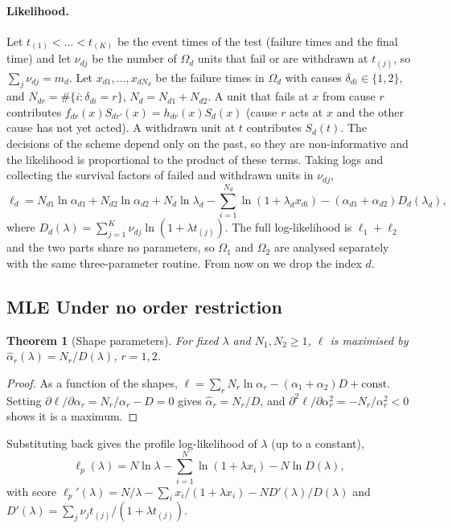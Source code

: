 \documentclass[a4paper,11pt]{article}
\newtheorem{theorem}{Theorem}[section]
\begin{document}
\paragraph{Likelihood.} Let $t_{(1)}<\dots<t_{(K)}$ be the event times of the test (failure times and the final time) and let $\nu_{dj}$ be the number of $\Omega_d$ units that fail or are withdrawn at $t_{(j)}$, so $\sum_j\nu_{dj}=m_d$. Let $x_{d1},\dots,x_{dN_d}$ be the failure times in $\Omega_d$ with causes $\delta_{di}\in\{1,2\}$, and $N_{dr}=\#\{i:\delta_{di}=r\}$, $N_d=N_{d1}+N_{d2}$. A unit that fails at $x$ from cause $r$ contributes $f_{dr}(x)S_{dr'}(x)=h_{dr}(x)S_d(x)$ (cause $r$ acts at $x$ and the other cause has not yet acted). A withdrawn unit at $t$ contributes $S_d(t)$. The decisions of the scheme depend only on the past, so they are non-informative and the likelihood is proportional to the product of these terms. Taking logs and collecting the survival factors of failed and withdrawn units in $\nu_{dj}$,
\begin{equation}\label{eq:ll}
\ell_d=N_{d1}\ln\alpha_{d1}+N_{d2}\ln\alpha_{d2}+N_d\ln\lambda_d-\sum_{i=1}^{N_d}\ln(1+\lambda_dx_{di})-(\alpha_{d1}+\alpha_{d2})D_d(\lambda_d),
\end{equation}
where $D_d(\lambda)=\sum_{j=1}^{K}\nu_{dj}\ln(1+\lambda t_{(j)})$. The full log-likelihood is $\ell_1+\ell_2$ and the two parts share no parameters, so $\Omega_1$ and $\Omega_2$ are analysed separately with the same three-parameter routine. From now on we drop the index $d$.

\subsection{MLE Under no order restriction}
\begin{theorem}[Shape parameters]\label{thm:shape}
For fixed $\lambda$ and $N_1,N_2\ge1$, $\ell$ is maximised by $\hat\alpha_r(\lambda)=N_r/D(\lambda)$, $r=1,2$.
\end{theorem}
\begin{proof}
As a function of the shapes, $\ell=\sum_rN_r\ln\alpha_r-(\alpha_1+\alpha_2)D+\text{const}$. Setting $\partial\ell/\partial\alpha_r=N_r/\alpha_r-D=0$ gives $\hat\alpha_r=N_r/D$, and $\partial^2\ell/\partial\alpha_r^2=-N_r/\alpha_r^2<0$ shows it is a maximum.
\end{proof}
Substituting back gives the profile log-likelihood of $\lambda$ (up to a constant),
\begin{equation}\label{eq:prof}
\ell_p(\lambda)=N\ln\lambda-\sum_{i=1}^{N}\ln(1+\lambda x_i)-N\ln D(\lambda),
\end{equation}
with score $\ell_p'(\lambda)=N/\lambda-\sum_i x_i/(1+\lambda x_i)-N D'(\lambda)/D(\lambda)$ and $D'(\lambda)=\sum_j\nu_jt_{(j)}/(1+\lambda t_{(j)})$.
\end{document}
